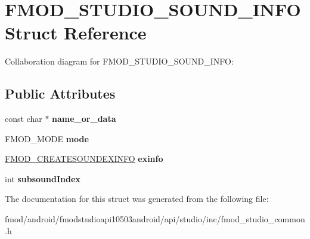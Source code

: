 \hypertarget{struct_f_m_o_d___s_t_u_d_i_o___s_o_u_n_d___i_n_f_o}{\section{F\+M\+O\+D\+\_\+\+S\+T\+U\+D\+I\+O\+\_\+\+S\+O\+U\+N\+D\+\_\+\+I\+N\+F\+O Struct Reference}
\label{struct_f_m_o_d___s_t_u_d_i_o___s_o_u_n_d___i_n_f_o}
}


Collaboration diagram for F\+M\+O\+D\+\_\+\+S\+T\+U\+D\+I\+O\+\_\+\+S\+O\+U\+N\+D\+\_\+\+I\+N\+F\+O\+:
\subsection*{Public Attributes}
\begin{DoxyCompactItemize}
\item 
\hypertarget{struct_f_m_o_d___s_t_u_d_i_o___s_o_u_n_d___i_n_f_o_ac35f8ee7194135b9342f27bd622760e9}{const char $\ast$ {\bfseries name\+\_\+or\+\_\+data}}\label{struct_f_m_o_d___s_t_u_d_i_o___s_o_u_n_d___i_n_f_o_ac35f8ee7194135b9342f27bd622760e9}

\item 
\hypertarget{struct_f_m_o_d___s_t_u_d_i_o___s_o_u_n_d___i_n_f_o_a6594bc04ad3896699c5287df1f14d709}{F\+M\+O\+D\+\_\+\+M\+O\+D\+E {\bfseries mode}}\label{struct_f_m_o_d___s_t_u_d_i_o___s_o_u_n_d___i_n_f_o_a6594bc04ad3896699c5287df1f14d709}

\item 
\hypertarget{struct_f_m_o_d___s_t_u_d_i_o___s_o_u_n_d___i_n_f_o_a98115893286fc65a7c5a126e56b68462}{\hyperlink{struct_f_m_o_d___c_r_e_a_t_e_s_o_u_n_d_e_x_i_n_f_o}{F\+M\+O\+D\+\_\+\+C\+R\+E\+A\+T\+E\+S\+O\+U\+N\+D\+E\+X\+I\+N\+F\+O} {\bfseries exinfo}}\label{struct_f_m_o_d___s_t_u_d_i_o___s_o_u_n_d___i_n_f_o_a98115893286fc65a7c5a126e56b68462}

\item 
\hypertarget{struct_f_m_o_d___s_t_u_d_i_o___s_o_u_n_d___i_n_f_o_aab5633115ab7b6934afc0dd47ee4960d}{int {\bfseries subsound\+Index}}\label{struct_f_m_o_d___s_t_u_d_i_o___s_o_u_n_d___i_n_f_o_aab5633115ab7b6934afc0dd47ee4960d}

\end{DoxyCompactItemize}


The documentation for this struct was generated from the following file\+:\begin{DoxyCompactItemize}
\item 
fmod/android/fmodstudioapi10503android/api/studio/inc/fmod\+\_\+studio\+\_\+common.\+h\end{DoxyCompactItemize}
